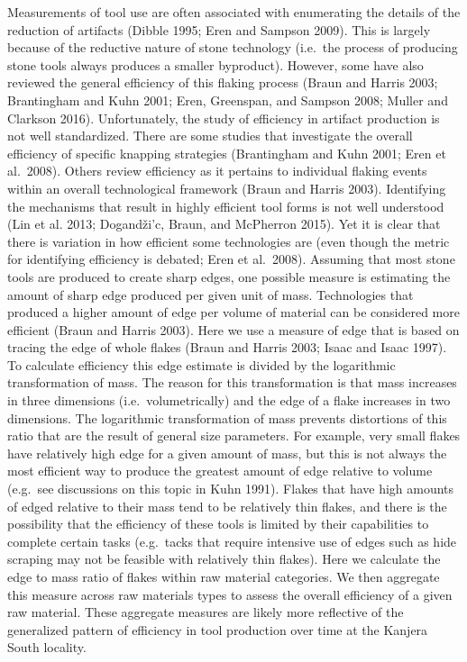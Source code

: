 \documentclass[]{elsarticle} %
\begin{document}
Measurements of tool use are often associated with enumerating the
details of the reduction of artifacts (Dibble 1995; Eren and Sampson
2009). This is largely because of the reductive nature of stone
technology (i.e.~the process of producing stone tools always produces a
smaller byproduct). However, some have also reviewed the general
efficiency of this flaking process (Braun and Harris 2003; Brantingham
and Kuhn 2001; Eren, Greenspan, and Sampson 2008; Muller and Clarkson
2016). Unfortunately, the study of efficiency in artifact production is
not well standardized. There are some studies that investigate the
overall efficiency of specific knapping strategies (Brantingham and Kuhn
2001; Eren et al.~2008). Others review efficiency as it pertains to
individual flaking events within an overall technological framework
(Braun and Harris 2003). Identifying the mechanisms that result in
highly efficient tool forms is not well understood (Lin et al. 2013;
Dogandži\a'c, Braun, and McPherron 2015). Yet it is clear that there is
variation in how efficient some technologies are (even though the metric
for identifying efficiency is debated; Eren et al.~2008). Assuming that
most stone tools are produced to create sharp edges, one possible
measure is estimating the amount of sharp edge produced per given unit
of mass. Technologies that produced a higher amount of edge per volume
of material can be considered more efficient (Braun and Harris 2003).
Here we use a measure of edge that is based on tracing the edge of whole
flakes (Braun and Harris 2003; Isaac and Isaac 1997). To calculate
efficiency this edge estimate is divided by the logarithmic
transformation of mass. The reason for this transformation is that mass
increases in three dimensions (i.e.~volumetrically) and the edge of a
flake increases in two dimensions. The logarithmic transformation of
mass prevents distortions of this ratio that are the result of general
size parameters. For example, very small flakes have relatively high
edge for a given amount of mass, but this is not always the most
efficient way to produce the greatest amount of edge relative to volume
(e.g.~see discussions on this topic in Kuhn 1991). Flakes that have high
amounts of edged relative to their mass tend to be relatively thin
flakes, and there is the possibility that the efficiency of these tools
is limited by their capabilities to complete certain tasks (e.g.~tacks
that require intensive use of edges such as hide scraping may not be
feasible with relatively thin flakes). Here we calculate the edge to
mass ratio of flakes within raw material categories. We then aggregate
this measure across raw materials types to assess the overall efficiency
of a given raw material. These aggregate measures are likely more
reflective of the generalized pattern of efficiency in tool production
over time at the Kanjera South locality.
\end{document}
